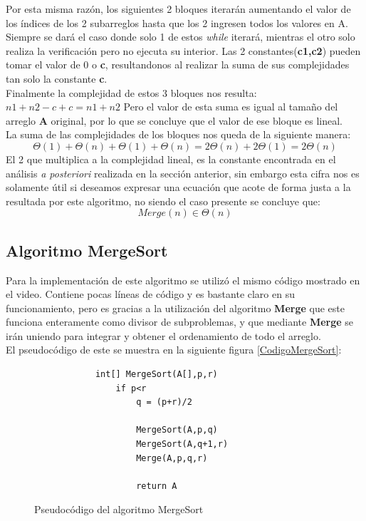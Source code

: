     Por esta misma razón, los siguientes 2 bloques iterarán aumentando el valor de los índices de los 2 subarreglos hasta que los 2 ingresen todos los valores en A. Siempre se dará el caso donde solo 1 de estos \textit{while} iterará, mientras el otro solo realiza la verificación pero no ejecuta su interior. Las 2 constantes(\textbf{c1,c2}) pueden tomar el valor de 0 o \textbf{c}, resultandonos al realizar la suma de sus complejidades tan solo la constante \textbf{c}.\\
    
    Finalmente la complejidad de estos 3 bloques nos resulta: $n1+n2-c+c = n1+n2$
    Pero el valor de esta suma es igual al tamaño del arreglo \textbf{A} original, por lo que se concluye que el valor de ese bloque es lineal.\\
    
    La suma de las complejidades de los bloques nos queda de la siguiente manera:
    \begin{equation*}
        \Theta(1) + \Theta(n) + \Theta(1) + \Theta(n) = 2\Theta(n) + 2\Theta(1) = 2\Theta(n)
    \end{equation*}
    El 2 que multiplica a la complejidad lineal, es la constante encontrada en el análisis \textit{a posteriori} realizada en la sección anterior, sin embargo esta cifra nos es solamente útil si deseamos expresar una ecuación que acote de forma justa a la resultada por este algoritmo, no siendo el caso presente se concluye que:
    \begin{equation*}
        Merge(n) \in \Theta(n)
    \end{equation*}
    
    
    
    
\subsection*{Algoritmo MergeSort}
    Para la implementación de este algoritmo se utilizó el mismo código mostrado en el video. Contiene pocas líneas de código y es bastante claro en su funcionamiento, pero es gracias a la utilización del algoritmo \textbf{Merge} que este funciona enteramente como divisor de subproblemas, y que mediante \textbf{Merge} se irán uniendo para integrar y obtener el ordenamiento de todo el arreglo. \\
    
    El pseudocódigo de este se muestra en la siguiente figura \ref{CodigoMergeSort}:
    \begin{figure}[!h]
        \centering
        \begin{verbatim}
            int[] MergeSort(A[],p,r)
                if p<r
                    q = (p+r)/2
                    
                    MergeSort(A,p,q)
                    MergeSort(A,q+1,r)
                    Merge(A,p,q,r)
                    
                    return A
        \end{verbatim}
        \caption{Pseudocódigo del algoritmo MergeSort}
        \label{PseudocodigoMergeSort}
    \end{figure}
    
